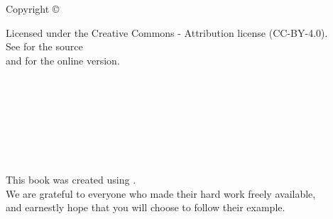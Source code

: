 \documentclass[10pt,statementpaper]{memoir}
\begin{document}
\pagestyle{empty}

{\begingroup
  \raggedleft
  \vspace*{\baselineskip}

{\Huge\itshape \sitetitle{}}\\[\baselineskip]

{\large\itshape
  \sitesubtitle{}
}\\[0.2\textheight]

{\large \siteauthor{}}\par

\vfill

{\large Copyright {\copyright} \siteyear{}}

\vspace*{\baselineskip}


\vspace*{\baselineskip}

{\small
  \begin{flushright}
  Licensed under the Creative Commons - Attribution license (CC-BY-4.0).
  \\
  See \siterepo{} for the source
  \\
  and \siteurl{} for the online version.
  \\
  \sitecover{}
  \end{flushright}
}

\endgroup}



\newpage
\pagestyle{empty}

~

\newpage
{}
\tableofcontents

\newpage
\pagestyle{empty}

~

\newpage
\listoffigures

\newpage
\pagestyle{empty}

~

\newpage
\listoftables

\newpage
\pagestyle{empty}

~

\newpage
\pagestyle{plain}



\cleartoverso
{\begingroup
  \raggedleft
  \vspace*{4\baselineskip}
  This book was created using \sitetools{}. \\
  We are grateful to everyone who made their hard work freely available, \\
  and earnestly hope that you will choose to follow their example.

\endgroup}
\end{document}
